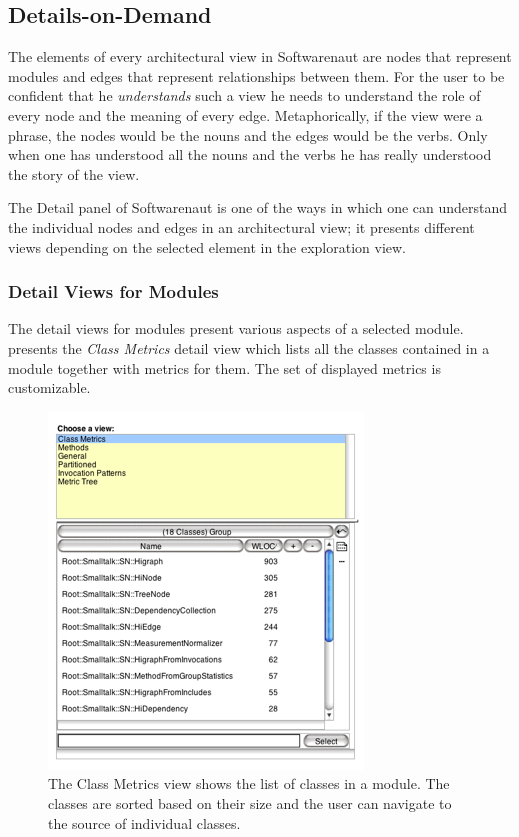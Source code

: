 \documentclass[preprint,12pt]{elsarticle}
\begin{document}
\newpage
\subsection {Details-on-Demand}


The elements of every architectural view in Softwarenaut are nodes that represent modules and edges that represent relationships between them. For the user to be confident that he {\em understands} such a view he needs to understand the role of every node and the meaning of every edge. Metaphorically, if the view were a phrase, the nodes would be the nouns and the edges would be the verbs. Only when one has understood all the nouns and the verbs he has really understood the story of the view.  

The Detail panel of Softwarenaut is one of the ways in which one can understand the individual nodes and edges in an architectural view; it presents different views depending on the selected element in the exploration view. %



\subsubsection {Detail Views for Modules}
The detail views for modules present various aspects of a selected module. 
 presents the {\em Class Metrics} detail view which lists all the classes contained in a module together with metrics for them. The set of displayed metrics is customizable. %

\begin{figure}[h]
\begin{center}
\includegraphics[width=0.54\linewidth]{images/DetailForNode.png}
\caption{The Class Metrics view shows the list of classes in a module. The classes are sorted based on their size and the user can navigate to the source of individual classes.}

\end{center}
\end{figure}
\end{document}
